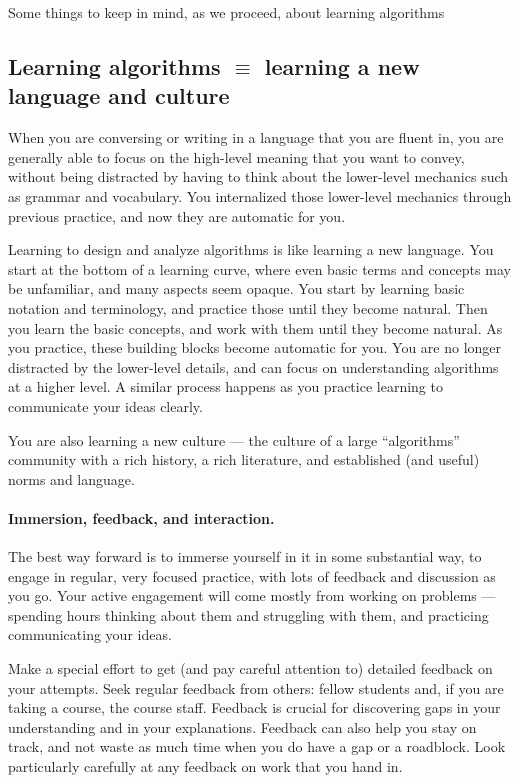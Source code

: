 \documentclass[11pt]{article}
\begin{document}
Some things to keep in mind, as we proceed, about learning algorithms

\subsection{Learning algorithms $\equiv$ learning a new language and culture}

When you are conversing or writing in a language that you are fluent in, you are generally able to focus on the high-level meaning that you want to convey, without being distracted by having to think about the lower-level mechanics such as grammar and vocabulary.  You internalized those lower-level mechanics through previous practice, and now they are automatic for you.

Learning to design and analyze algorithms is like learning a new language.  You start at the bottom of a learning curve, where even basic terms and concepts may be unfamiliar, and many aspects seem opaque.  You start by learning basic notation and terminology, and practice those until they become natural.  Then you learn the basic concepts, and work with them until they become natural.  As you practice, these building blocks become automatic for you.  You are no longer distracted by the lower-level details, and can focus on understanding algorithms at a higher level.  A similar process happens as you practice learning to communicate your ideas clearly.

You are also learning a new culture — the culture of a large ``algorithms'' community
with a rich history, a rich literature, and established (and useful) norms and language.

\paragraph{Immersion, feedback, and interaction.} 
The best way forward is to immerse yourself in it in some substantial way, to engage in regular, very focused practice, with lots of feedback and discussion as you go.
Your active engagement will come mostly from working on problems — spending hours thinking about them and struggling with them, and practicing communicating your ideas.

Make a special effort to get (and pay careful attention to) detailed feedback on your attempts.
Seek regular feedback from others: fellow students and, if you are taking a course, the course staff.
Feedback is crucial for discovering gaps in your understanding and in your explanations.
Feedback can also help you stay on track, and not waste as much time when you do have a gap or a roadblock.
Look particularly carefully at any feedback on work that you hand in. 
\end{document}
